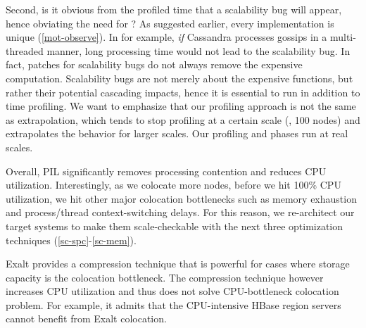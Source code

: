 




Second, is it obvious from the profiled time that a scalability bug will
appear, hence obviating the need for \sck?  
%
As suggested earlier, every implementation is unique
(\sec\ref{mot-observe}).  In \caone for example, {\em if} Cassandra
processes gossips in a multi-threaded manner, long processing time would
not lead to the scalability bug.
%
In fact, patches for scalability bugs do not always remove the expensive
computation.
%
Scalability bugs are not merely about the expensive functions, but rather
their potential cascading impacts, hence it is essential to run \sck 
in addition to time profiling.
We want to emphasize that our profiling approach is not the same as
extrapolation, which tends to stop profiling at a certain 
scale (\eg, 100 nodes)
and extrapolates the behavior for larger scales.  Our
profiling and \sck phases run at real scales.


\vfive Overall, PIL significantly removes processing contention and
reduces CPU utilization.  Interestingly, as we colocate more nodes, before
we hit 100\% CPU utilization, we hit other major colocation bottlenecks
such as memory exhaustion and process/thread context-switching delays.
%
For this reason, we re-architect our target systems to make them
scale-checkable with the next three optimization techniques
(\sec\ref{sc-spc}-\sec\ref{sc-mem}).



Exalt \cite{exalt} provides a compression technique that is powerful for
cases where storage capacity is the colocation bottleneck.
The compression technique however increases CPU utilization
and thus does not solve CPU-bottleneck colocation problem.
For example, it admits that the CPU-intensive HBase region servers
cannot benefit from Exalt colocation. 
\fi
